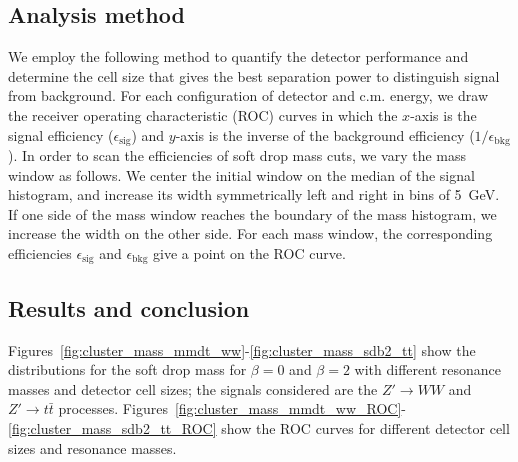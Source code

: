 \subsection{Analysis method \label{sec:massana}}
We employ the following method to quantify the detector performance and 
determine the cell size that gives the best separation power to distinguish 
signal from background. For each configuration of detector and c.m. energy, 
we draw the receiver operating characteristic (ROC) curves in which the $x$-axis
 is the signal efficiency ($\epsilon_\mathrm{sig}$) and $y$-axis is the inverse 
of the background efficiency ($1/\epsilon_\mathrm{bkg}$). 
In order to scan the efficiencies of soft drop mass cuts, we vary the mass 
window as follows. We center the initial window on the median of the signal histogram, and increase its width symmetrically left and right in bins of 5~GeV. 
If one side of the mass window reaches the boundary 
of the mass histogram, we increase the width on the other side. For each mass window, the corresponding efficiencies 
$\epsilon_\mathrm{sig}$ and $\epsilon_\mathrm{bkg}$ give a point on 
the ROC curve.

\subsection{Results and conclusion}

Figures~\ref{fig:cluster_mass_mmdt_ww}-\ref{fig:cluster_mass_sdb2_tt} 
show the distributions for the soft drop mass for $\beta=0$ and $\beta=2$ with  
different resonance masses and detector cell sizes; the signals considered are 
the $Z'\rightarrow WW$ and $Z'\rightarrow t\bar{t}$ processes. 
Figures~\ref{fig:cluster_mass_mmdt_ww_ROC}-\ref{fig:cluster_mass_sdb2_tt_ROC} 
show the ROC curves for different detector cell sizes and  resonance masses.

